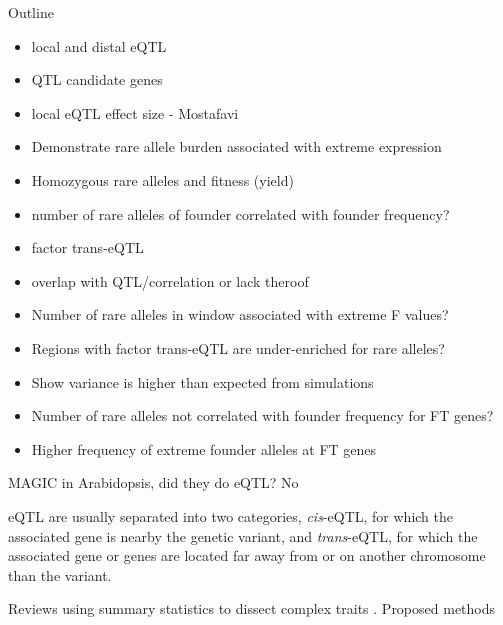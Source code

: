 \documentclass[article,9pt,twocolumn,twoside]{rilabRxiv}
\begin{document}
Outline
\begin{itemize}
    \item local and distal eQTL
    \item QTL candidate genes
    \item local eQTL effect size - Mostafavi
    \item Demonstrate rare allele burden associated with extreme expression
    \item Homozygous rare alleles and fitness (yield)
    \item number of rare alleles of founder correlated with founder frequency?
    \item factor trans-eQTL
    \item overlap with QTL/correlation or lack theroof
    \item Number of rare alleles in window associated with extreme F values?
    \item Regions with factor trans-eQTL are under-enriched for rare alleles?
    
    \item Show variance is higher than expected from simulations
    \item Number of rare alleles not correlated with founder frequency for FT genes?
    \item Higher frequency of extreme founder alleles at FT genes
   
\end{itemize}
\cite{Huang4} MAGIC in Arabidopsis, did they do eQTL? No


eQTL are usually separated into two categories, \emph{cis}-eQTL, for which the associated gene is nearby the genetic variant, and \emph{trans}-eQTL, for which the associated gene or genes are located far away from or on another chromosome than the variant.





Reviews using summary statistics to dissect complex traits \citep{PasaniucPrice}.
Proposed methods
\end{document}
